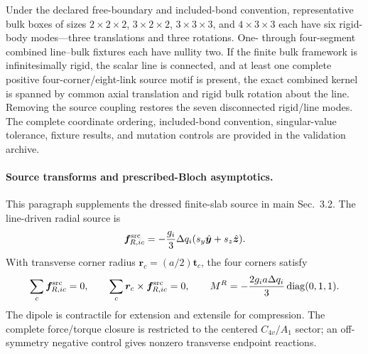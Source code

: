 \documentclass[10pt,aps,onecolumn,notitlepage,nofootinbib]{revtex4-2}
\newcommand{\vf}{\bm f}
\begin{document}
Under the declared free-boundary and included-bond convention, representative bulk boxes of sizes $2\times2\times2$, $3\times2\times2$, $3\times3\times3$, and $4\times3\times3$ each have six rigid-body modes---three translations and three rotations. One- through four-segment combined line--bulk fixtures each have nullity two. If the finite bulk framework is infinitesimally rigid, the scalar line is connected, and at least one complete positive four-corner/eight-link source motif is present, the exact combined kernel is spanned by common axial translation and rigid bulk rotation about the line. Removing the source coupling restores the seven disconnected rigid/line modes. The complete coordinate ordering, included-bond convention, singular-value tolerance, fixture results, and mutation controls are provided in the validation archive.

\paragraph*{Source transforms and prescribed-Bloch asymptotics.}
This paragraph supplements the dressed finite-slab source in main Sec.~3.2. The line-driven radial source is
\begin{equation}
 \vf^{\rm src}_{R,ic}=-\frac{g_i}{3}\Delta q_i(s_y\hat{\bm y}+s_z\hat{\bm z}).
\end{equation}
With transverse corner radius $\bm r_c=(a/2)\bm t_c$, the four corners satisfy
\begin{equation}
 \sum_c\vf^{\rm src}_{R,ic}=0,
 \qquad
 \sum_c\bm r_c\times\vf^{\rm src}_{R,ic}=0,
 \qquad
 M^R=-\frac{2g_i a\Delta q_i}{3}\operatorname{diag}(0,1,1).
\end{equation}
The dipole is contractile for extension and extensile for compression.  The complete force/torque closure is restricted to the centered $C_{4v}/A_1$ sector; an off-symmetry negative control gives nonzero transverse endpoint reactions.
\end{document}
